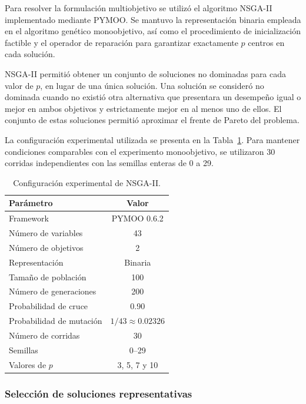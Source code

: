 \documentclass[journal]{IEEEtran}
\begin{document}
Para resolver la formulación multiobjetivo se utilizó el algoritmo NSGA-II implementado mediante PYMOO. Se mantuvo la representación binaria empleada en el algoritmo genético monoobjetivo, así como el procedimiento de inicialización factible y el operador de reparación para garantizar exactamente $p$ centros en cada solución.

NSGA-II permitió obtener un conjunto de soluciones no dominadas para cada valor de $p$, en lugar de una única solución. Una solución se consideró no dominada cuando no existió otra alternativa que presentara un desempeño igual o mejor en ambos objetivos y estrictamente mejor en al menos uno de ellos. El conjunto de estas soluciones permitió aproximar el frente de Pareto del problema.

La configuración experimental utilizada se presenta en la Tabla~\ref{tab:parametros_nsga2}. Para mantener condiciones comparables con el experimento monoobjetivo, se utilizaron 30 corridas independientes con las semillas enteras de 0 a 29.

\begin{table}[!t]
	\centering
	\caption{Configuración experimental de NSGA-II.}
	\label{tab:parametros_nsga2}
	\begin{tabular}{lc}
		\toprule
		\textbf{Parámetro} & \textbf{Valor} \\
		\midrule
		Framework & PYMOO 0.6.2 \\
		Número de variables & 43 \\
		Número de objetivos & 2 \\
		Representación & Binaria \\
		Tamaño de población & 100 \\
		Número de generaciones & 200 \\
		Probabilidad de cruce & 0.90 \\
		Probabilidad de mutación & $1/43 \approx 0.02326$ \\
		Número de corridas & 30 \\
		Semillas & 0--29 \\
		Valores de $p$ & 3, 5, 7 y 10 \\
		\bottomrule
	\end{tabular}
\end{table}

\subsubsection{Selección de soluciones representativas}
\end{document}
